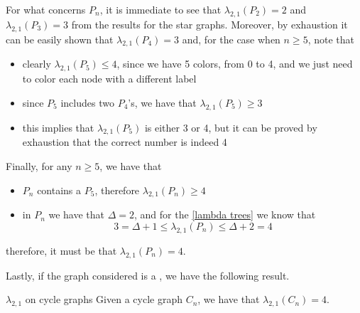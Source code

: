 \documentclass[a4paper, 12pt]{report}
\begin{document}
    For what concerns  $P_n$, it is immediate to see that $\lambda_{2,1}(P_2) = 2$ and $\lambda_{2,1}(P_3) = 3$ from the results for the star graphs. Moreover, by exhaustion it can be easily shown that $\lambda_{2,1}(P_4) = 3$ and, for the case when $n \ge 5$, note that

    \begin{itemize}
        \item clearly $\lambda_{2,1}(P_5) \le 4$, since we have 5 colors, from 0 to 4, and we just need to color each node with a different label
        \item since $P_5$ includes two $P_4$'s, we have that $\lambda_{2,1}(P_5) \ge 3$
        \item this implies that $\lambda_{2,1}(P_5)$ is either 3 or 4, but it can be proved by exhaustion that the correct number is indeed 4
    \end{itemize}

    Finally, for any $n \ge 5$, we have that

    \begin{itemize}
        \item $P_n$ contains a $P_5$, therefore $\lambda_{2,1}(P_n) \ge 4$
        \item in $P_n$ we have that $\Delta = 2$, and for the \cref{lambda trees} we know that $$3 = \Delta + 1 \le \lambda_{2,1}(P_n) \le \Delta + 2 = 4$$
    \end{itemize}

    therefore, it must be that $\lambda_{2,1}(P_n) = 4$.

    Lastly, if the graph considered is a , we have the following result.

    \begin{framedthm}{$\lambda_{2,1}$ on cycle graphs}
        Given a cycle graph $C_n$, we have that $\lambda_{2,1}(C_n) = 4$.
    \end{framedthm}
\end{document}
